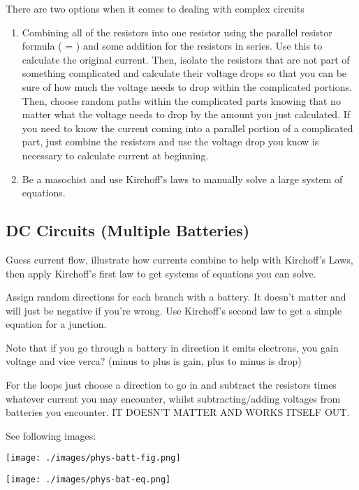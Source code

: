 \documentclass[letterpaper]{article}
\begin{document}
There are two options when it comes to dealing with complex circuits
\begin{enumerate}
\item Combining all of the resistors into one resistor using the parallel resistor formula ( =  ) and some addition for the resistors in series. Use this to calculate the original current. Then, isolate the resistors that are not part of something complicated and calculate their voltage drops so that you can be sure of how much the voltage needs to drop within the complicated portions. Then, choose random paths within the complicated parts knowing that no matter what the voltage needs to drop by the amount you just calculated. If you need to know the current coming into a parallel portion of a complicated part, just combine the resistors and use the voltage drop you know is necessary to calculate current at beginning.
\item Be a masochist and use Kirchoff's laws to manually solve a large system of equations.
\end{enumerate}

\subsection{DC Circuits (Multiple Batteries)}
\label{sec:org6a71425}

Guess current flow, illustrate how currents combine to help with Kirchoff's Laws, then apply Kirchoff's first law to get systems of equations you can solve.

Assign random directions for each branch with a battery. It doesn't matter and will just be negative if you're wrong. Use Kirchoff's second law to get a simple equation for a junction.

Note that if you go through a battery in direction it emits electrons, you gain voltage and vice verca? (minus to plus is gain, plus to minus is drop)

For the loops just choose a direction to go in and subtract the resistors times whatever current you may encounter, whilst subtracting/adding voltages from batteries you encounter. IT DOESN'T MATTER AND WORKS ITSELF OUT.

See following images:
\begin{center}
\texttt{[image: ./images/phys-batt-fig.png]}
\end{center}
\begin{center}
\texttt{[image: ./images/phys-bat-eq.png]}
\end{center}
\end{document}
